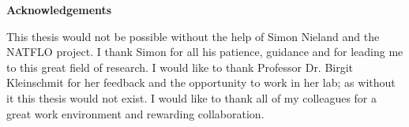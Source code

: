 \begin{center}{\textbf{Acknowledgements}}\end{center}
This thesis would not be possible without the help of Simon Nieland and the 
NATFLO project. I thank Simon for all his patience, guidance and for leading me 
to this great field of research. I would like to thank Professor 
Dr. Birgit Kleinschmit for her feedback and the opportunity to work in her lab; 
as without it this thesis would not exist. I would like to thank all of my 
colleagues for a great work environment and rewarding collaboration.